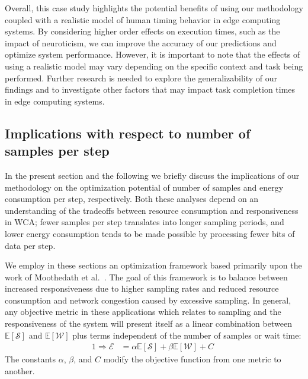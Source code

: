 Overall, this case study highlights the potential benefits of using our methodology coupled with a realistic model of human timing behavior in edge computing systems.
By considering higher order effects on execution times, such as the impact of neuroticism, we can improve the accuracy of our predictions and optimize system performance.
However, it is important to note that the effects of using a realistic model may vary depending on the specific context and task being performed.
Further research is needed to explore the generalizability of our findings and to investigate other factors that may impact task completion times in edge computing systems.

\subsection{Implications with respect to number of samples per step}

In the present section and the following we briefly discuss the implications of our methodology on the optimization potential of number of samples and energy consumption per step, respectively.
Both these analyses depend on an understanding of the tradeoffs between resource consumption and responsiveness in \gls{WCA};
fewer samples per step translates into longer sampling periods, and lower energy consumption tends to be made possible by processing fewer bits of data per step.

We employ in these sections an optimization framework based primarily upon the work of Moothedath et al.~\cite{moothedath2021energy,moothedath2022energy1,moothedath2022energy2}.
The goal of this framework is to balance between increased responsiveness due to higher sampling rates and reduced resource consumption and network congestion caused by excessive sampling.
In general, any objective metric in these applications which relates to sampling and the responsiveness of the system will present itself
as a linear combination between \ensuremath{\mathbb{E}[\mathcal{S}]} and \ensuremath{\mathbb{E}[\mathcal{W}]} plus terms independent of the number of samples or wait time:
\begin{alignat}{1}\label{eq:tradeoff}
    \Rightarrow\mathcal{E}&=\alpha\mathbb{E}[\mathcal{S}]+\beta\mathbb{E}[\mathcal{W}]+C\;
\end{alignat}
The constants \ensuremath{\alpha}, \ensuremath{\beta}, and \ensuremath{C} modify the objective function from one metric to another.

